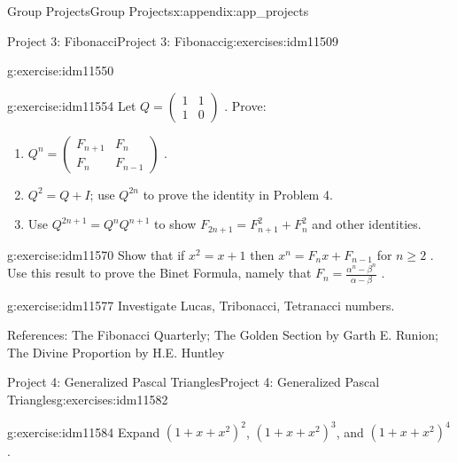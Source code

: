 \documentclass[oneside,10pt,]{book}
\numberwithin{equation}{chapter}
\newcommand{\amp}{&}
\begin{document}
\begin{appendixptx}{Group Projects}{}{Group Projects}{}{}{x:appendix:app_projects}
\begin{exercises-section-numberless}{Project 3: Fibonacci}{}{Project 3: Fibonacci}{}{}{g:exercises:idm11509}
\begin{divisionexercise}{6}{}{}{g:exercise:idm11550}
\begin{equation*}
\end{equation*}
%
\end{divisionexercise}%
\begin{divisionexercise}{7}{}{}{g:exercise:idm11554}%
Let \(Q =\begin{pmatrix}1 \amp 1 \\ 1 \amp 0\end{pmatrix}\) . Prove:%
\begin{enumerate}[label=(\alph*)]
\item{}\(Q^{n} = \begin{pmatrix} F_{n + 1} \amp F_{n}\\ F_{n} \amp F_{n - 1} \end{pmatrix}\) .%
\item{}\(Q^{2} = Q + I\); use \(Q^{2n}\) to prove the identity in Problem 4.%
\item{}Use \(Q^{2n + 1} = Q^{n}Q^{n + 1}\) to show \(F_{2n + 1} = F_{n + 1}^{2} + F_{n}^{2}\) and other identities.%
\end{enumerate}
%
\end{divisionexercise}%
\begin{divisionexercise}{8}{}{}{g:exercise:idm11570}%
Show that if \(x^{2} = x + 1\) then \(x^{n} = F_{n}x + F_{n - 1}\) for \(n \geq 2\) . Use this result to prove the Binet Formula, namely that \(F_{n} = \frac{\alpha^{n} - \beta^{n}}{\alpha - \beta}\) .%
\end{divisionexercise}%
\begin{divisionexercise}{9}{}{}{g:exercise:idm11577}%
Investigate Lucas, Tribonacci, Tetranacci numbers.%
\end{divisionexercise}%
\begin{conclusion}{}%
References: The Fibonacci Quarterly; The Golden Section by Garth E. Runion; The Divine Proportion by H.E. Huntley%
\end{conclusion}%
\end{exercises-section-numberless}
%
%
\typeout{************************************************}
\typeout{************************************************}
%
\begin{exercises-section-numberless}{Project 4: Generalized Pascal Triangles}{}{Project 4: Generalized Pascal Triangles}{}{}{g:exercises:idm11582}
\begin{divisionexercise}{1}{}{}{g:exercise:idm11584}%
Expand \({\left( 1 + x + x^{2} \right)}^{2}\), \(\left( 1 + x + x^{2} \right)^{3}\), and \(\left( 1 + x + x^{2} \right)^{4}\).%

\end{divisionexercise}
\end{exercises-section-numberless}
\end{appendixptx}
\end{document}
